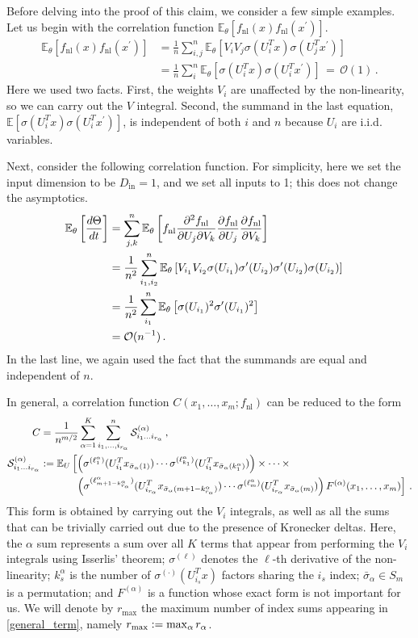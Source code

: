 \documentclass[english]{article}
\newcommand{\dho}{\partial}
\newcommand{\Din}{\ensuremath{D_{\mathrm{in}}}}
\newcommand{\fnl}{f_{\mathrm{nl}}}
\newcommand{\es}[2] {\begin{align} \label{#1} #2 \end{align}}
\newcommand{\lexp}{\mathbb{E}\left[}
\newcommand{\lexpp}[1]{\mathbb{E}_{#1}\left[}
\newcommand{\rexp}{\right]}
\begin{document}
Before delving into the proof of this claim, we consider a few simple examples.
Let us begin with the correlation function $\lexpp{\theta} \fnl(x)\fnl(x^{\prime})\rexp$.
\es{twopoint}{
\lexpp{\theta} \fnl(x)\fnl(x^{\prime})\rexp&=\frac{1}{n}\sum_{i,j}^{n}\lexpp{\theta} V_{i}V_{j}\sigma(U_{i}^T x)\sigma(U_{j}^T x^{\prime})\rexp\\
&=\frac{1}{n}\sum_{i}^{n}\lexpp{\theta}\sigma(U_{i}^T x)\sigma(U_{i}^T x^{\prime})\rexp \,=\, \mathcal{O}(1)\,.
}
Here we used two facts.
First, the weights $V_{i}$ are unaffected by the non-linearity, so we can carry out the $V$ integral.
Second, the summand in the last equation, $\lexp\sigma(U_{i}^T x)\sigma(U_{i}^T x^{\prime})\rexp$, is independent of both $i$ and $n$ because $U_i$ are i.i.d. variables.

Next, consider the following correlation function.
For simplicity, here we set the input dimension to be $\Din=1$, and we set all inputs to 1; this does not change the asymptotics.
\es{nontrivexp}{
  \lexpp{\theta} \frac{d\Theta}{dt}\rexp&=
  \sum_{j,k}^n \lexpp{\theta} \fnl\frac{\dho^2 \fnl}{\dho U_{j} \dho V_{k}}
  \frac{\dho \fnl}{\dho U_{j}} \frac{\dho \fnl}{\dho V_{k}}\rexp\cr
  &=\frac{1}{n^{2}} \sum_{i_{1}, i_{2}}^n \lexpp{\theta}
  V_{i_{1}} V_{i_{2}} \sigma(U_{i_{1}}) \sigma^{\prime}(U_{i_{2}}) \sigma^{\prime}(U_{i_{2}}) \sigma(U_{i_{2}})\rexp\cr
  &=\frac{1}{n^{2}} \sum_{i_{1}}^n \lexpp{\theta} \sigma(U_{i_{1}})^2 \sigma^{\prime}(U_{i_{1}})^2
  \rexp\cr
  &=\mathcal{O}(n^{-1})\,.
} 
In the last line, we again used the fact that the summands are equal and independent of $n$.

In general, a correlation function $C(x_1,\dots,x_m;\fnl)$ can be reduced to the form
\es{general_term}{
C &= \frac{1}{n^{m/2}}\sum_{\alpha=1}^{K}\sum_{i_{1},\ldots,i_{r_{\alpha}}}^{n} \mathcal{S}^{(\alpha)}_{i_{1}\ldots i_{r_{\alpha}}}
\,, \\
\mathcal{S}_{i_{1}\ldots i_{r_{\alpha}}}^{(\alpha)} &:= \lexpp{U} \left(\sigma^{(\ell_{1}^{\alpha})}(U_{i_{1}}^T x_{\bar{\sigma}_{\alpha}(1)})\cdots\sigma^{(\ell_{k_{1}}^{\alpha})}(U_{i_{1}}^T x_{\bar{\sigma}_{\alpha}(k_{1}^{\alpha})})\right) \times \cdots \times
\right. \cr &\quad \qquad \,\, \left.
\left(\sigma^{(\ell^{\alpha}_{m+1-k^{\alpha}_{r_{\alpha}}})}(U_{i_{r_{\alpha}}}^T x_{\bar{\sigma}_{\alpha}(m+1-k^{\alpha}_{r_{\alpha}})})\cdots\sigma^{(\ell^{\alpha}_{m})}(U_{i_{r_{\alpha}}}^T x_{\bar{\sigma}_{\alpha}(m)})\right)F^{(\alpha)}(x_{1},\dots,x_{m})\rexp
\,.\nonumber\\
}
This form is obtained by carrying out the $V_{i}$ integrals, as well as all the sums that can be trivially carried out due to the presence of Kronecker deltas.
Here, the $\alpha$ sum represents a sum over all $K$ terms that appear from performing the $V_{i}$ integrals using Isserlis' theorem;
$\sigma^{(\ell)}$ denotes the $\ell$-th derivative of the non-linearity;
$k_{s}^{\alpha}$ is the number of $\sigma^{(\cdot)}(U^{T}_{i_{s}}x)$ factors sharing the $i_{s}$ index;
$\bar{\sigma}_{\alpha} \in S_m$ is a permutation; and $F^{(\alpha)}$ is a function whose exact form is not important for us.
We will denote by $r_{\textrm{max}}$ the maximum number of index sums appearing in \eqref{general_term}, namely $r_{\rm max}:=\max_{\alpha}r_{\alpha}$.
\end{document}
